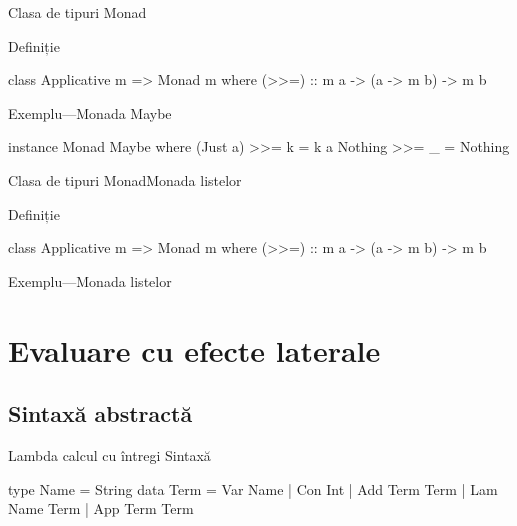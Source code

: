 \documentclass[xcolor=pdftex,romanian,colorlinks]{beamer}
\begin{document}
\begin{frame}[fragile]{Clasa de tipuri Monad}
\begin{block}{Definiție}
\begin{asciihs}
class Applicative m => Monad m where
    (>>=)       :: m a -> (a -> m b) -> m b
\end{asciihs}
\end{block}
\begin{block}{Exemplu---Monada Maybe}
\begin{asciihs}

instance Monad Maybe where
    (Just a) >>= k = k a
    Nothing  >>= _ = Nothing
\end{asciihs}
\end{block}

\end{frame}

\begin{frame}[fragile]{Clasa de tipuri Monad}{Monada listelor}
\begin{block}{Definiție}
\begin{asciihs}
class Applicative m => Monad m where
    (>>=)       :: m a -> (a -> m b) -> m b
\end{asciihs}
\end{block}
\begin{block}{Exemplu---Monada listelor}
\end{block}
\end{frame}


\section{Evaluare cu efecte laterale}

\subsection{Sintaxă abstractă}

\begin{frame}[fragile]{Lambda calcul cu întregi}
{Sintaxă}
\begin{asciihs}
type Name = String
data Term
  = Var Name
  | Con Int
  | Add Term Term
  | Lam Name Term
  | App Term Term
\end{asciihs}
\end{frame}
\end{document}
